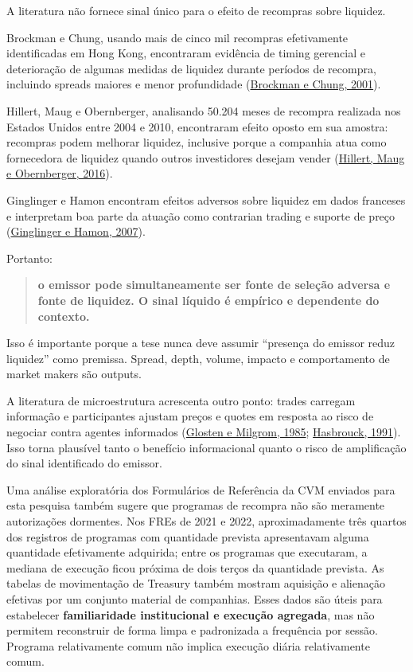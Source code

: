 \documentclass[
  a4paper,
]{article}
\begin{document}
A literatura não fornece sinal único para o efeito de recompras sobre
liquidez.

Brockman e Chung, usando mais de cinco mil recompras efetivamente
identificadas em Hong Kong, encontraram evidência de timing gerencial e
deterioração de algumas medidas de liquidez durante períodos de
recompra, incluindo spreads maiores e menor profundidade
(\protect\hyperlink{ref-7}{Brockman e Chung, 2001}).

Hillert, Maug e Obernberger, analisando 50.204 meses de recompra
realizada nos Estados Unidos entre 2004 e 2010, encontraram efeito
oposto em sua amostra: recompras podem melhorar liquidez, inclusive
porque a companhia atua como fornecedora de liquidez quando outros
investidores desejam vender (\protect\hyperlink{ref-8}{Hillert, Maug e
Obernberger, 2016}).

Ginglinger e Hamon encontram efeitos adversos sobre liquidez em dados
franceses e interpretam boa parte da atuação como contrarian trading e
suporte de preço (\protect\hyperlink{ref-9}{Ginglinger e Hamon, 2007}).

Portanto:

\begin{quote}
\textbf{o emissor pode simultaneamente ser fonte de seleção adversa e
fonte de liquidez. O sinal líquido é empírico e dependente do contexto.}
\end{quote}

Isso é importante porque a tese nunca deve assumir ``presença do emissor
reduz liquidez'' como premissa. Spread, depth, volume, impacto e
comportamento de market makers são outputs.

A literatura de microestrutura acrescenta outro ponto: trades carregam
informação e participantes ajustam preços e quotes em resposta ao risco
de negociar contra agentes informados (\protect\hyperlink{ref-4}{Glosten
e Milgrom, 1985}; \protect\hyperlink{ref-5}{Hasbrouck, 1991}). Isso
torna plausível tanto o benefício informacional quanto o risco de
amplificação do sinal identificado do emissor.

Uma análise exploratória dos Formulários de Referência da CVM enviados
para esta pesquisa também sugere que programas de recompra não são
meramente autorizações dormentes. Nos FREs de 2021 e 2022,
aproximadamente três quartos dos registros de programas com quantidade
prevista apresentavam alguma quantidade efetivamente adquirida; entre os
programas que executaram, a mediana de execução ficou próxima de dois
terços da quantidade prevista. As tabelas de movimentação de Treasury
também mostram aquisição e alienação efetivas por um conjunto material
de companhias. Esses dados são úteis para estabelecer
\textbf{familiaridade institucional e execução agregada}, mas não
permitem reconstruir de forma limpa e padronizada a frequência por
sessão. Programa relativamente comum não implica execução diária
relativamente comum.
\end{document}
